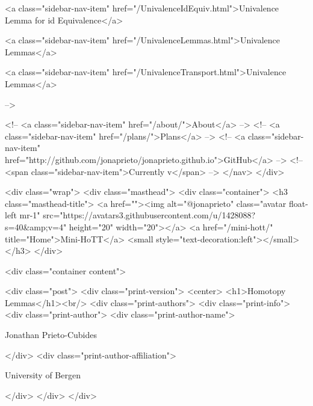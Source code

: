       
    
      
        
          <a class="sidebar-nav-item" href="/UnivalenceIdEquiv.html">Univalence Lemma for id Equivalence</a>
        
      
    
      
        
          <a class="sidebar-nav-item" href="/UnivalenceLemmas.html">Univalence Lemmas</a>
        
      
    
      
        
          <a class="sidebar-nav-item" href="/UnivalenceTransport.html">Univalence Lemmas</a>
        
      
     -->

    <!-- <a class="sidebar-nav-item" href="/about/">About</a> -->
    <!-- <a class="sidebar-nav-item" href="/plans/">Plans</a> -->
    <!-- <a class="sidebar-nav-item" href="http://github.com/jonaprieto/jonaprieto.github.io">GitHub</a> -->
    <!-- <span class="sidebar-nav-item">Currently v</span> -->
  </nav>
</div>

    <div class="wrap">
      <div class="masthead">
        <div class="container">
          <h3 class="masthead-title">
            <a href=""><img alt="@jonaprieto" class="avatar float-left mr-1" src="https://avatars3.githubusercontent.com/u/1428088?s=40&amp;v=4" height="20" width="20"></a>
            <a href="/mini-hott/" title="Home">Mini-HoTT</a>
            <small style="text-decoration:left"></small>
          </h3>
        </div>
      
      <div class="container content">
        







<div class="post">
  <div class="print-version">
    <center>
      <h1>Homotopy Lemmas</h1><br/>
        <div class="print-authors">
          <div class="print-info">
            <div class="print-author">
              <div class="print-author-name">
                
                  Jonathan Prieto-Cubides
                
              </div>
              <div class="print-author-affiliation">
                
                  University of Bergen
                
                </div>
            </div>
          </div>
          
